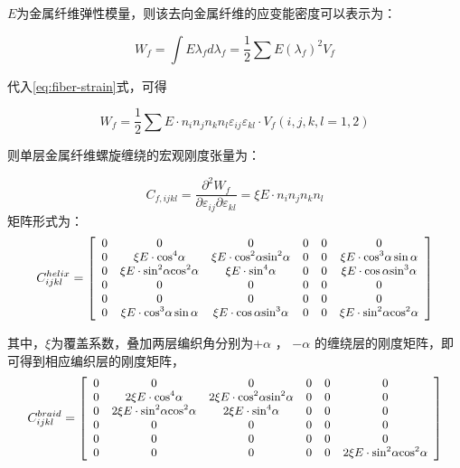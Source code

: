 $ E $为金属纤维弹性模量，则该去向金属纤维的应变能密度可以表示为：

\begin{equation}
{{W_f} = \int E {\lambda _f}d{\lambda _f} = \frac{1}{2}\sum {E{{\left( {{\lambda _f}} \right)}^2}} {V_f}}
\end{equation}

代入\ref{eq:fiber-strain}式，可得

\begin{equation}
{{W_f} = \frac{1}{2}\sum {E \cdot {n_i}{n_j}{n_k}{n_l}{\varepsilon _{ij}}{\varepsilon _{kl}}}  \cdot {V_f}\left( {i,j,k,l = 1,2} \right)}
\end{equation}

则单层金属纤维螺旋缠绕的宏观刚度张量为：

\begin{equation}
{{C_{f,ijkl}} = \frac{{{\partial ^2}{W_f}}}{{\partial {\varepsilon _{ij}}\partial {\varepsilon _{kl}}}} = \xi E \cdot {n_i}{n_j}{n_k}{n_l}}
\end{equation}
矩阵形式为：
\begin{equation}\small
{\hangjut{1}
C_{ijkl}^{helix} = \left[ {\begin{array}{*{20}{c}}
	{\rm{0}}&{\rm{0}}&{\rm{0}}&{\rm{0}}&{\rm{0}}&{\rm{0}}\\
	{\rm{0}}&{\xi E \cdot {{\cos }^4}\alpha }&{\xi E \cdot {{\cos }^2}\alpha {{\sin }^2}\alpha }&0&{\rm{0}}&{\xi E \cdot {{\cos }^3}\alpha \sin \alpha }\\
	{\rm{0}}&{\xi E \cdot {{\sin }^2}\alpha {{\cos }^2}\alpha }&{\xi E \cdot {{\sin }^4}\alpha }&0&{\rm{0}}&{\xi E \cdot \cos \alpha {{\sin }^3}\alpha }\\
	{\rm{0}}&{\rm{0}}&{\rm{0}}&{\rm{0}}&{\rm{0}}&{\rm{0}}\\
	{\rm{0}}&{\rm{0}}&{\rm{0}}&{\rm{0}}&{\rm{0}}&{\rm{0}}\\
	{\rm{0}}&{\xi E \cdot {{\cos }^3}\alpha \sin \alpha }&{\xi E \cdot \cos \alpha {{\sin }^3}\alpha }&{\rm{0}}&{\rm{0}}&{\xi E \cdot {{\sin }^2}\alpha {{\cos }^2}\alpha }
	\end{array}} \right]
}
\end{equation}

其中，$  \xi $为覆盖系数，叠加两层编织角分别为$  + \alpha  $ ， $- \alpha  $ 的缠绕层的刚度矩阵，即可得到相应编织层的刚度矩阵，
\begin{equation}\small
{\hangjut{1}
C_{ijkl}^{braid} = \left[ {\begin{array}{*{20}{c}}
	{\rm{0}}&{\rm{0}}&{\rm{0}}&{\rm{0}}&{\rm{0}}&{\rm{0}}\\
	{\rm{0}}&{2\xi E \cdot {{\cos }^4}\alpha }&{2\xi E \cdot {{\cos }^2}\alpha {{\sin }^2}\alpha }&0&{\rm{0}}&{\rm{0}}\\
	{\rm{0}}&{2\xi E \cdot {{\sin }^2}\alpha {{\cos }^2}\alpha }&{2\xi E \cdot {{\sin }^4}\alpha }&0&{\rm{0}}&{\rm{0}}\\
	{\rm{0}}&{\rm{0}}&{\rm{0}}&{\rm{0}}&{\rm{0}}&{\rm{0}}\\
	{\rm{0}}&{\rm{0}}&{\rm{0}}&{\rm{0}}&{\rm{0}}&{\rm{0}}\\
	{\rm{0}}&0&0&{\rm{0}}&{\rm{0}}&{2\xi E \cdot {{\sin }^2}\alpha {{\cos }^2}\alpha }
	\end{array}} \right]
}
\end{equation}


